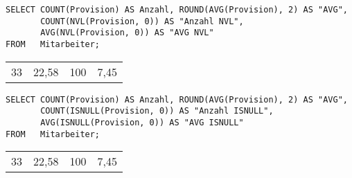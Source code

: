 \begin{lstlisting}[language=oracle_sql,caption={AVG und NULL-Werte in Oracle},label=sql05_09]
SELECT COUNT(Provision) AS Anzahl, ROUND(AVG(Provision), 2) AS "AVG",
       COUNT(NVL(Provision, 0)) AS "Anzahl NVL",
       AVG(NVL(Provision, 0)) AS "AVG NVL"
FROM   Mitarbeiter;
        \end{lstlisting}
\begin{center}
    \begin{small}
        \tablehead{}

        \begin{oraclesql}
            \begin{supertabular}{rrrr}
                33 & 22,58 & 100 & 7,45 \\
            \end{supertabular}
        \end{oraclesql}
    \end{small}
\end{center}
\begin{lstlisting}[language=ms_sql,caption={AVG und NULL-Werte im MS SQL Server},label=sql05_10]
SELECT COUNT(Provision) AS Anzahl, ROUND(AVG(Provision), 2) AS "AVG",
       COUNT(ISNULL(Provision, 0)) AS "Anzahl ISNULL",
       AVG(ISNULL(Provision, 0)) AS "AVG ISNULL"
FROM   Mitarbeiter;
        \end{lstlisting}
\begin{center}
    \begin{small}
        \tablehead{}

        \begin{mssql}
            \begin{supertabular}{llll}
                33 & 22,58 & 100 & 7,45 \\
            \end{supertabular}
        \end{mssql}
    \end{small}
\end{center}
